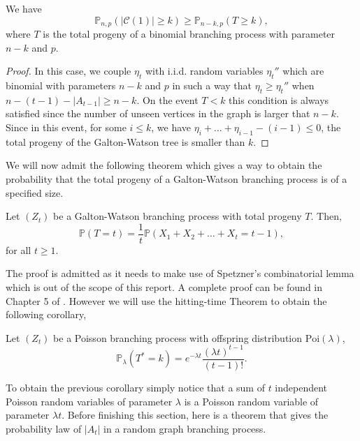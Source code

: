 \begin{theorem}\label{th:lowbin}
	We have
	\begin{equation}
		\mathbb{P}_{n,p}(|\mathcal{C}(1)| \geq k) \geq \mathbb{P}_{n-k,p}(T\geq k),
	\end{equation}
	where $T$ is the total progeny of a binomial branching process with parameter $n-k$ and $p$.
\end{theorem}
\begin{proof}
	In this case, we couple $\eta_t$ with i.i.d. random variables $\eta_t''$ which are binomial with parameters $n-k$ and $p$ in such a way that $\eta_t \geq \eta_t''$ when $n-(t-1)-|A_{t-1}| \geq n-k$.
	On the event $T<k$ this condition is always satisfied since the number of unseen vertices in the graph is larger that $n-k$. 
	Since in this event, for some $i\leq k$, we have $\eta_i + \ldots + \eta_{i-1} - (i-1) \leq 0$, the total progeny of the Galton-Watson tree is smaller than $k$.
\end{proof}
We will now admit the following theorem which gives a way to obtain the probability that the total progeny of a Galton-Watson branching process is of a specified size.
\begin{theorem}
	Let $(Z_t)$ be a Galton-Watson branching process with total progeny $T$. Then,
	\begin{equation}
		\mathbb{P}(T = t) = \frac{1}{t} \mathbb{P}(X_1 + X_2 + \ldots + X_t = t-1),
	\end{equation}
	for all $t\geq 1$.
\end{theorem}
The proof is admitted as it needs to make use of Spetzner's combinatorial lemma which is out of the scope of this report. 
A complete proof can be found in Chapter 5 of \cite{Roch15}.
\newline
However we will use the hitting-time Theorem to obtain the following corollary,
\begin{corollary}\label{th:sizePoi}
	Let $(Z_t)$ be a Poisson branching process with offspring distribution $\text{Poi}(\lambda)$,
	\begin{equation}
		\mathbb{P}_{\lambda}(T^* = k) = e^{-\lambda t}\frac{(\lambda t)^{t-1}}{(t-1)!}.
	\end{equation}
\end{corollary}
To obtain the previous corollary simply notice that a sum of $t$ independent Poisson random variables of parameter $\lambda$ is a Poisson random variable of parameter $\lambda t$.
Before finishing this section, here is a theorem that gives the probability law of $|A_t|$ in a random graph branching process.
